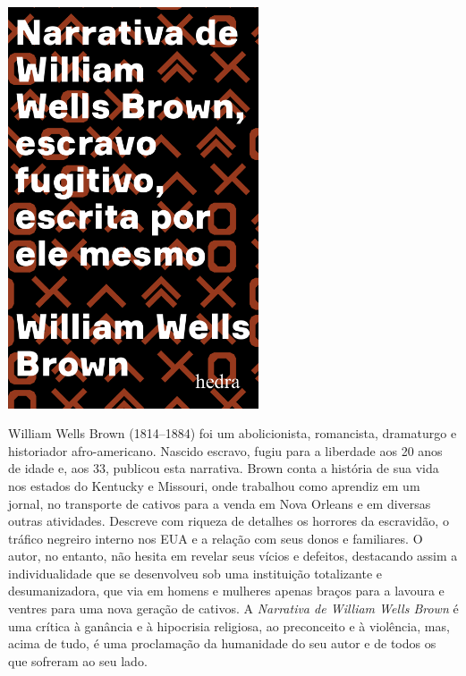 \pagebreak

\begin{center}
\hspace*{.5cm}\includegraphics[width=74mm]{./grid/brown.jpeg}
\end{center}

\hspace*{-7cm}\hrulefill\hspace*{-7cm}

\medskip

\noindent{}William Wells Brown (1814–1884) foi um abolicionista, romancista, dramaturgo e historiador afro-americano. Nascido escravo, fugiu para a liberdade aos 20 anos de idade e, aos 33, publicou esta narrativa. Brown conta a história de sua vida nos estados do Kentucky e Missouri, onde trabalhou como aprendiz em um jornal, no transporte de cativos para a venda em Nova Orleans e em diversas outras atividades. Descreve com riqueza de detalhes os horrores da escravidão, o tráfico negreiro interno nos EUA e a relação com seus donos e familiares.
O autor, no entanto, não hesita em revelar seus vícios e defeitos, destacando assim a individualidade que se desenvolveu sob uma instituição totalizante e desumanizadora, que via em homens e mulheres apenas braços para a lavoura e ventres para uma nova geração de cativos. A \textit{Narrativa de William Wells Brown} é uma crítica à ganância e à hipocrisia religiosa, ao preconceito e à violência, mas, acima de tudo, é uma proclamação da humanidade do seu autor e de todos os que sofreram ao seu lado.


